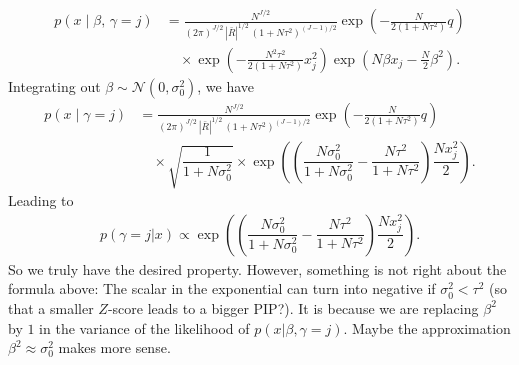 \documentclass[11pt]{article}
\begin{document}
\begin{align}\label{eq:conditional-prob-x-given-beta-gamma-prime}
p(x \mid \beta,\,\gamma=j)
&= \frac{N^{J/2}}{(2\pi)^{J/2}\,|\bar{R}|^{1/2}\,(1+N\tau^2)^{(J-1)/2}}
\exp\!\left(-\frac{N}{2(1+N\tau^2)}q\right) \nonumber \\
&\quad\times
\exp\!\left(-\frac{N^2\tau^2}{2(1+N\tau^2)}x_j^2\right)
\exp\!\left(N\beta x_j - \frac{N}{2}\beta^2\right).
\end{align}
Integrating out $\beta \sim \mathcal{N}(0, \sigma_{0}^2)$, we have
\begin{align}\label{eq:conditional-prob-x-given-gamma-prime}
p(x \mid \gamma=j)
&= \frac{N^{J/2}}{(2\pi)^{J/2}\,|\bar{R}|^{1/2}\,(1+N\tau^2)^{(J-1)/2}}
\exp\!\left(-\frac{N}{2(1+N\tau^2)}q\right) \nonumber \\
&\quad\times \sqrt{\dfrac{1}{1 + N\sigma_{0}^2}} \times \exp\left(\left(\dfrac{N \sigma_0^2}{1 + N \sigma_0^2} - \dfrac{N\tau^2}{1 + N \tau^2} \right) \dfrac{N x_j^2}{2} \right).
\end{align}
Leading to
\begin{align}\label{eq:PIP-SER-prime-unit}
p(\gamma=j | x) 
\propto \exp\left(\left(\dfrac{N \sigma_0^2}{1 + N \sigma_0^2} - \dfrac{N\tau^2}{1 + N \tau^2} \right) \dfrac{N x_j^2}{2} \right).
\end{align}
So we truly have the desired property. However, something is not right about the formula above: The scalar in the exponential can turn into negative if $\sigma_0^2 < \tau^2$ (so that a smaller $Z$-score leads to a bigger PIP?). It is because we are replacing $\beta^2$ by $1$ in the variance of the likelihood of $p(x | \beta, \gamma = j)$. Maybe the approximation $\beta^2 \approx \sigma_0^2$ makes more sense.
\end{document}
